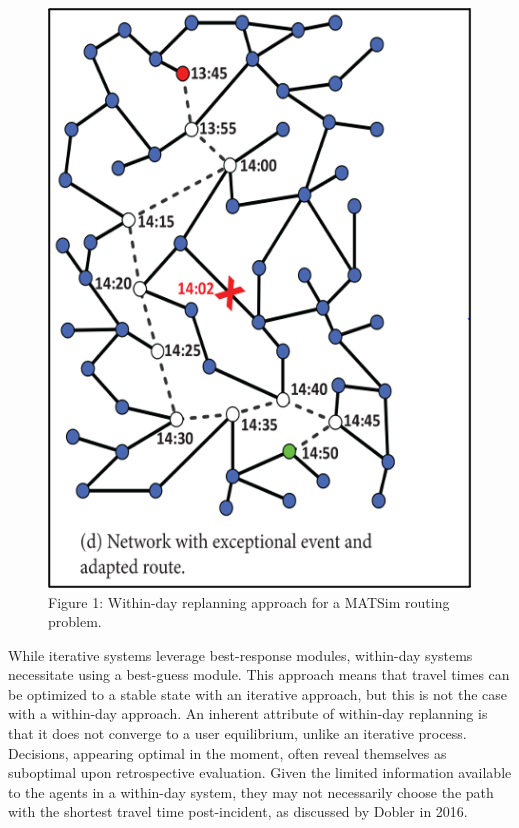 \documentclass[
  letterpaper,
  authoryear]{elsarticle}
\begin{document}
\begin{figure}

{\centering \includegraphics{figures/fig1.png}

}

\caption{Figure 1: Within-day replanning approach for a MATSim routing
problem.}

\end{figure}

While iterative systems leverage best-response modules, within-day
systems necessitate using a best-guess module. This approach means that
travel times can be optimized to a stable state with an iterative
approach, but this is not the case with a within-day approach. An
inherent attribute of within-day replanning is that it does not converge
to a user equilibrium, unlike an iterative process. Decisions, appearing
optimal in the moment, often reveal themselves as suboptimal upon
retrospective evaluation. Given the limited information available to the
agents in a within-day system, they may not necessarily choose the path
with the shortest travel time post-incident, as discussed by Dobler in
2016.
\end{document}
